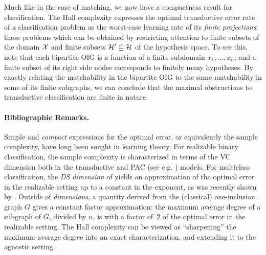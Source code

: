Much like in the case of matching, we now have a compactness result for classification. The Hall complexity expresses the optimal transductive error rate of a classification problem as the worst-case learning rate of its \emph{finite projections}: those problems which can be obtained by restricting attention to finite subsets of the domain $\mathcal{X}$ and finite subsets $\mathcal{H}' \subseteq \mathcal{H}$ of the hypothesis space. To see this, note that  each bipartite OIG is a function of a finite subdomain $x_1,\ldots,x_n$, and a finite subset of its right side nodes corresponds to finitely many hypotheses.  By exactly relating the matchability in the bipartite OIG to the same matchability in some of its finite subgraphs, we can conclude that the maximal obstructions to transductive classification are finite in nature. %


\paragraph{Bibliographic Remarks.} Simple and \emph{compact} expressions for the optimal error, or equivalently the sample complexity, have long been sought in learning theory. For realizable binary classification, the sample complexity is characterized in terms of the VC dimension both in the transductive \cite{haussler_predicting_1994,li_one-inclusion_2001} and PAC (see e.g. \cite{shalev-shwartz_understanding_2014}) models.    For multiclass classification, the \emph{DS dimension} of \citet{daniely_optimal_2014} yields an approximation of the optimal error in the realizable setting up to a constant in the exponent, as was recently shown by \citet{brukhim_characterization_2022}. Outside of  \emph{dimensions}, a quantity derived from the (classical) one-inclusion graph $G$ gives a constant factor approximation: the maximum average degree of a subgraph of $G$, divided by $n$, is with a factor of~$2$ of the optimal error in the realizable setting. The Hall complexity can be viewed as ``sharpening'' the maximum-average degree into an exact characterization, and extending it to the agnostic setting.

